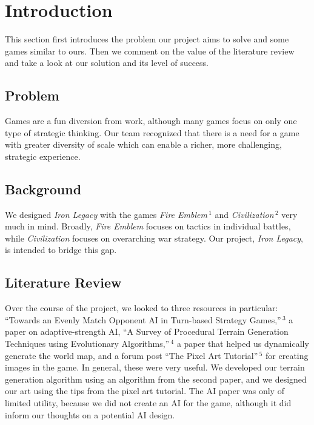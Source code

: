 \documentclass{article}
\begin{document}
\clearpage

\tableofcontents

\clearpage

\section*{Introduction}
This section first introduces the problem our project aims to solve and some
games similar to ours.
Then we comment on the value of the literature review and take a look at our
solution and its level of success.

\subsection*{Problem}
Games are a fun diversion from work, although many games focus on only one type
of strategic thinking. Our team recognized that there is a need for a game with
greater diversity of scale which can enable a richer, more challenging,
strategic experience.

\subsection*{Background}
We designed \emph{Iron Legacy} with the games 
\emph{Fire Emblem}$\,^1$ and \emph{Civilization}$\,^2$ 
very much in mind.
Broadly, \emph{Fire Emblem} focuses on tactics in individual battles, while
\emph{Civilization} focuses on overarching war strategy.
Our project, \emph{Iron Legacy}, is intended to bridge this gap.

\subsection*{Literature Review}
Over the course of the project, we looked to three resources in particular:
``Towards an Evenly Match Opponent AI in Turn-based Strategy Games,''$\,^3$
a paper on adaptive-strength AI, 
``A Survey of Procedural Terrain Generation Techniques using Evolutionary 
Algorithms,''$\,^4$ a paper that helped us dynamically
generate the world map, and a forum post ``The Pixel Art 
Tutorial''$\,^5$ for creating images in the game.
In general, these were very useful.
We developed our terrain generation algorithm using an algorithm from the 
second paper, and we designed our art using the tips from the pixel art
tutorial.
The AI paper was only of limited utility, because we did not create an AI for
the game, although it did inform our thoughts on a potential AI design.
\end{document}

